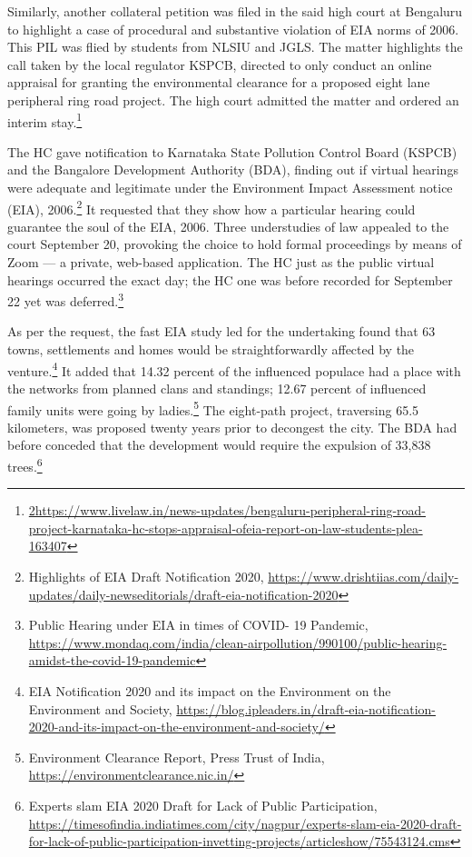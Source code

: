 \begin{multicols}{2}
\noi
Similarly, another collateral petition was filed in the said high court at Bengaluru to highlight
a case of procedural and substantive violation of EIA norms of 2006. This PIL was flied by
students from NLSIU and JGLS. The matter highlights the call taken by the local regulator
KSPCB, directed to only conduct an online appraisal for granting the environmental
clearance for a proposed eight lane peripheral ring road project. The high court admitted the
matter and ordered an interim stay.\footnote{\url{2https://www.livelaw.in/news-updates/bengaluru-peripheral-ring-road-project-karnataka-hc-stops-appraisal-ofeia-report-on-law-students-plea-163407}}

\noi
The HC gave notification to Karnataka State Pollution Control Board (KSPCB) and the
Bangalore Development Authority (BDA), finding out if virtual hearings were adequate and
legitimate under the Environment Impact Assessment notice (EIA), 2006.\footnote{Highlights of EIA Draft Notification 2020, \url{https://www.drishtiias.com/daily-updates/daily-newseditorials/draft-eia-notification-2020}} It requested that
they show how a particular hearing could guarantee the soul of the EIA, 2006. Three
understudies of law appealed to the court September 20, provoking the choice to hold formal
proceedings by means of Zoom — a private, web-based application. The HC just as the
public virtual hearings occurred the exact day; the HC one was before recorded for
September 22 yet was deferred.\footnote{Public Hearing under EIA in times of COVID- 19 Pandemic, \url{https://www.mondaq.com/india/clean-airpollution/990100/public-hearing-amidst-the-covid-19-pandemic}}

\noi
As per the request, the fast EIA study led for the undertaking found that 63 towns, settlements
and homes would be straightforwardly affected by the venture.\footnote{EIA Notification 2020 and its impact on the Environment on the Environment and Society,
\url{https://blog.ipleaders.in/draft-eia-notification-2020-and-its-impact-on-the-environment-and-society/}} It added that 14.32 percent
of the influenced populace had a place with the networks from planned clans and standings;
12.67 percent of influenced family units were going by ladies.\footnote{Environment Clearance Report, Press Trust of India, \url{https://environmentclearance.nic.in/}} The eight-path project,
traversing 65.5 kilometers, was proposed twenty years prior to decongest the city. The BDA
had before conceded that the development would require the expulsion of 33,838 trees.\footnote{Experts slam EIA 2020 Draft for Lack of Public Participation,
\url{https://timesofindia.indiatimes.com/city/nagpur/experts-slam-eia-2020-draft-for-lack-of-public-participation-invetting-projects/articleshow/75543124.cms}}



\end{multicols}
